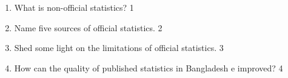 \documentclass{article}
\begin{document}
\begin{enumerate}
  \begin{enumerate}
    \item
	What is non-official statistics? \hfill 1
    \item
	Name five sources of official statistics. \hfill 2
    \item  
	Shed some light on the limitations of official statistics. \hfill 3
    \item
	How can the quality of published statistics in Bangladesh e improved? \hfill 4
  \end{enumerate}

\end{enumerate}
\end{document}

